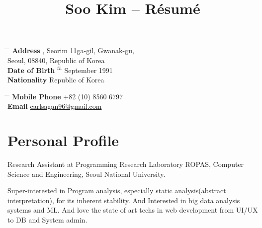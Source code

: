 \documentclass[10pt]{article} %
\begin{document}

\title{Soo Kim -- Résumé} %


\parbox{0.5\textwidth}{ %
\begin{tabbing} %
\hspace{3cm} \= \hspace{4cm} \= \kill %
{\bf Address} , Seorim 11ga-gil, Gwanak-gu,\\ %
\> Seoul, 08840, Republic of Korea \\ %
{\bf Date of Birth} $^{th}$ September 1991 \\ %
{\bf Nationality} \> Republic of Korea %
\end{tabbing}}
\hfill %
\parbox{0.5\textwidth}{ %
\begin{tabbing} %
\hspace{3cm} \= \hspace{4cm} \= \kill %
{\bf Mobile Phone} \> +82 (10) 8560 6797 \\ %
{\bf Email} \> \href{mailto:carlsagan96@gmail.com}{carlsagan96@gmail.com} \\ %
\end{tabbing}}


\section{Personal Profile}

Research Assistant at Programming Research Laboratory ROPAS, Computer Science and Engineering, Seoul National University.

Super-interested in Program analysis, especially static analysis(abstract interpretation), for its inherent stability. And Interested in big data analysis systems and ML. And love the state of art techs in web development from UI/UX to DB and System admin.
\end{document}
